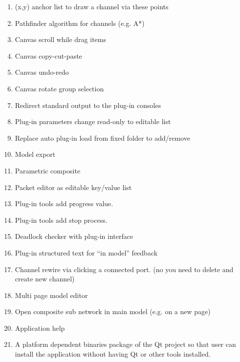 \begin{enumerate}\label{sec:feature-list}
\item	(x,y) anchor list to draw a channel via these points
\item	Pathfinder algorithm for channels (e.g. A*)
\item	Canvas scroll while drag items
\item	Canvas copy-cut-paste
\item	Canvas undo-redo
\item	Canvas rotate group selection
\item	Redirect standard output to the plug-in consoles
\item	Plug-in parameters change read-only to editable list
\item	Replace auto plug-in load from fixed folder to add/remove
\item	Model export
\item	Parametric composite
\item	Packet editor as editable key/value list
\item	Plug-in tools add progress value.
\item	Plug-in tools add stop process. 
\item	Deadlock checker with plug-in interface
\item	Plug-in structured text for “in model” feedback
\item Channel rewire via clicking a connected port. (no you need to delete and
create new channel)
\item	Multi page model editor
\item	Open composite sub network in main model (e.g. on a new page)
\item	Application help
\item A platform dependent binaries package of the Qt project so that user can
install the application without having Qt or other tools installed.
\end{enumerate}
